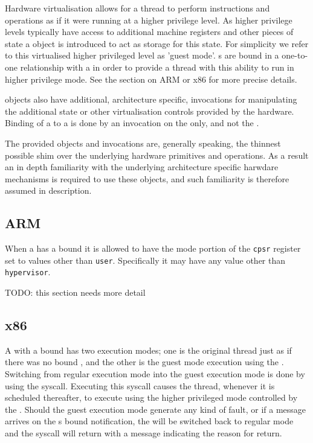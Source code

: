 Hardware virtualisation allows for a thread to perform instructions and operations as if it were
running at a higher privilege level. As higher privilege levels typically have access to
additional machine registers and other pieces of state a  object is introduced to act
as storage for this state. For simplicity we refer to this virtualised higher privileged level as
'guest mode'. s are bound in a one-to-one relationship with a  in order
to provide a thread with this ability to run in higher privilege mode. See the section on
ARM or x86 for more precise details.

 objects also have additional, architecture specific, invocations for manipulating
the additional state or other virtualisation controls provided by the hardware. Binding of
a  to a  is done by an invocation on the  only, and not the .

The provided objects and invocations are, generally speaking, the thinnest possible shim over
the underlying hardware primitives and operations. As a result an in depth familiarity with
the underlying architecture specific harwdare mechanisms is required to use these objects, and
such familiarity is therefore assumed in description.

\subsection{ARM}

When a  has a bound  it is allowed to have the mode portion of the
\texttt{cpsr} register set to values other than \texttt{user}. Specifically it may have any value other than
\texttt{hypervisor}.

TODO: this section needs more detail

\subsection{x86}

A  with a bound  has two execution modes; one is the original thread just as
if there was no bound , and the other is the guest mode execution using the
. Switching from regular execution mode into the guest execution mode is
done by using the  syscall. Executing this syscall causes the thread, whenever
it is scheduled thereafter, to execute using the higher privileged mode controlled by the .
Should the guest execution mode generate any kind of fault, or if a message arrives
on the s bound notification, the  will be switched back to regular mode
and the  syscall will return with a message indicating the reason for return.

